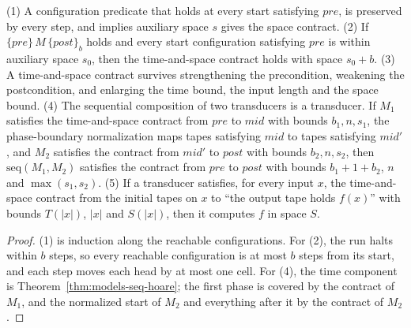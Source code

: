 \begin{lemma}
  \label{lem:space-hoare-rules}
  \leanok
  (1) A configuration predicate that holds at every start satisfying
  $\mathit{pre}$, is preserved by every step, and implies auxiliary space $s$
  gives the space contract. (2) If $\{\mathit{pre}\}\, M\,
  \{\mathit{post}\}_b$ holds and every start configuration satisfying
  $\mathit{pre}$ is within auxiliary space $s_0$, then the time-and-space
  contract holds with space $s_0 + b$. (3) A time-and-space contract survives
  strengthening the precondition, weakening the postcondition, and enlarging
  the time bound, the input length and the space bound. (4) The sequential
  composition of two transducers is a transducer. If $M_1$ satisfies the
  time-and-space contract from $\mathit{pre}$ to $\mathit{mid}$ with bounds
  $b_1, n, s_1$, the phase-boundary normalization maps tapes satisfying
  $\mathit{mid}$ to tapes satisfying $\mathit{mid}'$, and $M_2$ satisfies the
  contract from $\mathit{mid}'$ to $\mathit{post}$ with bounds $b_2, n, s_2$,
  then $\mathrm{seq}(M_1, M_2)$ satisfies the contract from $\mathit{pre}$ to
  $\mathit{post}$ with bounds $b_1 + 1 + b_2$, $n$ and $\max(s_1, s_2)$.
  (5) If a transducer satisfies, for every input $x$, the time-and-space
  contract from the initial tapes on $x$ to ``the output tape holds $f(x)$''
  with bounds $T(|x|)$, $|x|$ and $S(|x|)$, then it computes $f$ in space $S$.
\end{lemma}
\begin{proof}
  \leanok
  (1) is induction along the reachable configurations. For (2), the run halts
  within $b$ steps, so every reachable configuration is at most $b$ steps from
  its start, and each step moves each head by at most one cell. For (4), the
  time component is
  Theorem~\ref{thm:models-seq-hoare}; the first phase is covered by the
  contract of $M_1$, and the normalized start of $M_2$ and everything after it
  by the contract of $M_2$.
\end{proof}

